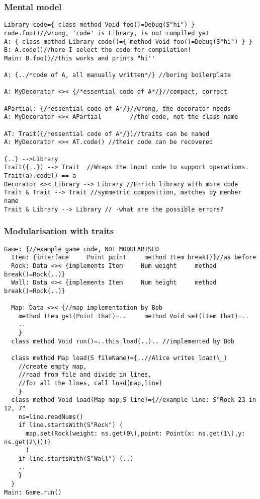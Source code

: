 \begin{frame}[fragile]
\frametitle{Mental model}
\begin{NiceCode}{59ex}{0.8}
\begin{lstlisting}
Library code={ class method Void foo()=Debug(S"hi") }
code.foo()//wrong, 'code' is Library, is not compiled yet
A: { class method Library code()={ method Void foo()=Debug(S"hi") } } 
B: A.code()//here I select the code for compilation!
Main: B.foo()//this works and prints "hi''

A: {../*code of A, all manually written*/} //boring boilerplate

A: MyDecorator <>< {/*essential code of A*/}//compact, correct

APartial: {/*essential code of A*/}//wrong, the decorator needs
A: MyDecorator <>< APartial        //the code, not the class name

AT: Trait({/*essential code of A*/})//traits can be named
A: MyDecorator <>< AT.code() //their code can be recovered
 
{..} -->Library
Trait({..}) --> Trait  //Wraps the input code to support operations.
Trait(a).code() == a
Decorator <>< Library --> Library //Enrich library with more code
Trait & Trait --> Trait //symmetric composition, matches by member name
Trait & Library --> Library // -what are the possible errors?
\end{lstlisting}
\end{NiceCode}
\end{frame}



\begin{frame}[fragile]
\frametitle{Modularisation with traits}
\begin{NiceCode}{59ex}{0.7}
\begin{lstlisting}
Game: {//example game code, NOT MODULARISED
  Item: {interface     Point point     method Item break()}//as before
  Rock: Data <>< {implements Item     Num weight     method break()=Rock(..)}
  Wall: Data <>< {implements Item     Num height     method break()=Rock(..)}
  
  Map: Data <>< {//map implementation by Bob
    method Item get(Point that)=..     method Void set(Item that)=..
    ..
    }
  class method Void run()=..this.load(..).. //implemented by Bob
  
  class method Map load(S fileName)={..//Alice writes load(\_)
    //create empty map,
    //read from file and divide in lines,
    //for all the lines, call load(map,line)
    }
  class method Void load(Map map,S line)={//example line: S"Rock 23 in 12, 7"
    ns=line.readNums()
    if line.startsWith(S"Rock") (
      map.set(Rock(weight: ns.get(0\),point: Point(x: ns.get(1\),y: ns.get(2\))))
      )
    if line.startsWith(S"Wall") (..)
    ..
    }
  }
Main: Game.run()
\end{lstlisting}
\end{NiceCode}
\end{frame}



